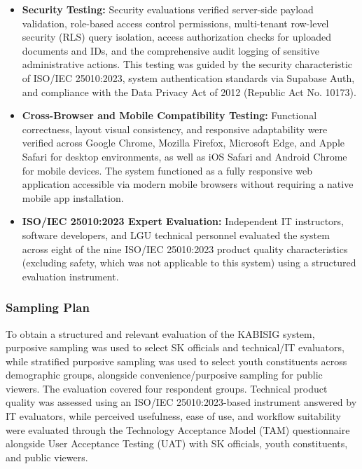 \begin{itemize}
    \item \textbf{Security Testing:} Security evaluations verified server-side payload validation, role-based access control permissions, multi-tenant row-level security (RLS) query isolation, access authorization checks for uploaded documents and IDs, and the comprehensive audit logging of sensitive administrative actions. This testing was guided by the security characteristic of ISO/IEC 25010:2023, system authentication standards via Supabase Auth, and compliance with the Data Privacy Act of 2012 (Republic Act No. 10173).
    \item \textbf{Cross-Browser and Mobile Compatibility Testing:} Functional correctness, layout visual consistency, and responsive adaptability were verified across Google Chrome, Mozilla Firefox, Microsoft Edge, and Apple Safari for desktop environments, as well as iOS Safari and Android Chrome for mobile devices. The system functioned as a fully responsive web application accessible via modern mobile browsers without requiring a native mobile app installation.
    \item \textbf{ISO/IEC 25010:2023 Expert Evaluation:} Independent IT instructors, software developers, and LGU technical personnel evaluated the system across eight of the nine ISO/IEC 25010:2023 product quality characteristics (excluding safety, which was not applicable to this system) using a structured evaluation instrument.
\end{itemize}

\subsubsection{Sampling Plan}
\label{subsubsec:sampling_plan}

To obtain a structured and relevant evaluation of the KABISIG system, purposive sampling was used to select SK officials and technical/IT evaluators, while stratified purposive sampling was used to select youth constituents across demographic groups, alongside convenience/purposive sampling for public viewers. The evaluation covered four respondent groups. Technical product quality was assessed using an ISO/IEC 25010:2023-based instrument answered by IT evaluators, while perceived usefulness, ease of use, and workflow suitability were evaluated through the Technology Acceptance Model (TAM) questionnaire alongside User Acceptance Testing (UAT) with SK officials, youth constituents, and public viewers.

